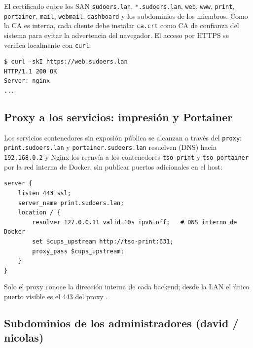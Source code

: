 
El certificado cubre los SAN \texttt{sudoers.lan}, \texttt{*.sudoers.lan},
\texttt{web}, \texttt{www}, \texttt{print}, \texttt{portainer}, \texttt{mail},
\texttt{webmail}, \texttt{dashboard} y los subdominios de los miembros. Como
la CA es interna, cada cliente debe instalar \texttt{ca.crt} como CA de
confianza del sistema para evitar la advertencia del navegador. El acceso por
HTTPS se verifica localmente con \texttt{curl}:

\begin{lstlisting}[style=terminal]
$ curl -skI https://web.sudoers.lan
HTTP/1.1 200 OK
Server: nginx
...
\end{lstlisting}


\subsection{Proxy a los servicios: impresi\'on y Portainer}

Los servicios contenedores sin exposi\'on p\'ublica se alcanzan a trav\'es
del \texttt{proxy}: \texttt{print.sudoers.lan} y \texttt{portainer.sudoers.lan}
resuelven (DNS) hacia \texttt{192.168.0.2} y Nginx los reenv\'ia a los
contenedores \texttt{tso-print} y \texttt{tso-portainer} por la red interna de
Docker, sin publicar puertos adicionales en el host:

\begin{lstlisting}[style=terminal]
server {
    listen 443 ssl;
    server_name print.sudoers.lan;
    location / {
        resolver 127.0.0.11 valid=10s ipv6=off;   # DNS interno de Docker
        set $cups_upstream http://tso-print:631;
        proxy_pass $cups_upstream;
    }
}
\end{lstlisting}

Solo el proxy conoce la direcci\'on interna de cada backend; desde la LAN el
\'unico puerto visible es el 443 del proxy \citep{nginxDocs}.

\subsection{Subdominios de los administradores (david / nicolas)}


